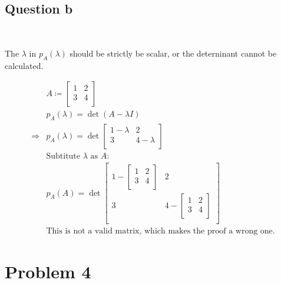 \documentclass{article}
\begin{document}
\subsection{Question b}

~

The $\lambda$ in $p_A(\lambda)$ should be strictly be scalar, or the deterninant cannot be calculated.

\begin{equation*}
    \begin{split}
        &A\coloneqq\begin{bmatrix}
            1&2\\
            3&4\\
        \end{bmatrix}\\
        &p_A(\lambda)=\det(A-\lambda I)\\
        \Rightarrow&p_A(\lambda)=\det\begin{bmatrix}
            1-\lambda&2\\
            3&4-\lambda\\
        \end{bmatrix}\\
        &\text{Subtitute } \lambda \text{ as }A:\\
        &p_A(A)=\det\begin{bmatrix}
            1-\begin{bmatrix}
                1&2\\
                3&4\\
            \end{bmatrix}&2\\
            3&4-\begin{bmatrix}
                1&2\\
                3&4\\
            \end{bmatrix}\\
        \end{bmatrix}\\
        &\text{This is not a valid matrix, which makes the proof a wrong one.}
    \end{split}
\end{equation*}

\newpage

\section{Problem 4}
\end{document}
